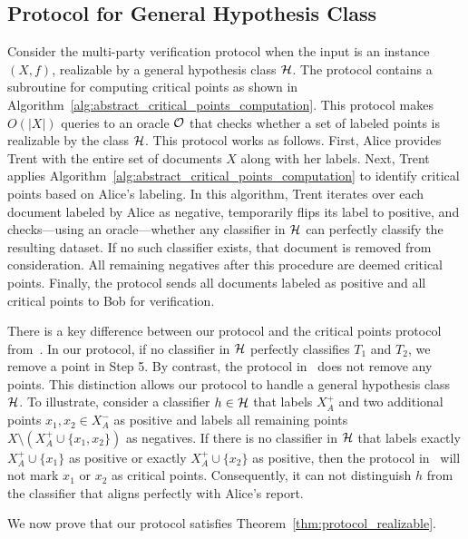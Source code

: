 \subsection{Protocol for General Hypothesis Class}\label{sec:realizable_general}

Consider the  multi-party verification protocol  when the input is an instance $(X,f)$, realizable by a general hypothesis class $\mathcal{H}$. The protocol contains a subroutine for computing critical points as shown in Algorithm~\ref{alg:abstract_critical_points_computation}. 
This protocol makes $O(|X|)$ queries to an oracle $\mathcal{O}$ that checks whether a set of labeled points is realizable by the class $\mathcal{H}$.
This protocol works as follows.
First, Alice provides Trent with the entire set of documents $X$ along with her labels. Next, Trent applies Algorithm~\ref{alg:abstract_critical_points_computation} to identify critical points based on Alice’s labeling. 
In this algorithm, Trent iterates over each document labeled by Alice as negative, temporarily flips its label to positive, and checks—using an oracle—whether any classifier in $\mathcal{H}$ can perfectly classify the resulting dataset. If no such classifier exists, that document is removed from consideration. All remaining negatives after this procedure are deemed critical points. Finally, the protocol sends all documents labeled as positive and all critical points to Bob for verification.

There is a key difference between our protocol and the critical points protocol from~\cite{dong2022classification}. In our protocol, if no classifier in $\mathcal{H}$ perfectly classifies $T_1$ and $T_2$, we remove a point in Step 5. 
By contrast, the protocol in~\cite{dong2022classification} does not remove any points. 
This distinction allows our protocol to handle a general hypothesis class $\mathcal{H}$. 
To illustrate, consider a classifier $h \in \mathcal{H}$ that labels $X_A^+$ and two additional points $x_1,x_2 \in X_A^-$ as positive and labels all remaining points $X \setminus (X_A^+\cup \{x_1,x_2\})$ as negatives. 
If there is no classifier in $\mathcal{H}$ that labels exactly $X_A^+ \cup \{x_1\}$ as positive or exactly $X_A^+ \cup \{x_2\}$ as positive, then the protocol in~\cite{dong2022classification} will not mark $x_1$ or $x_2$ as critical points. Consequently, it can not distinguish $h$ from the classifier that aligns perfectly with Alice’s report.

We now prove that our protocol satisfies Theorem~\ref{thm:protocol_realizable}. 

